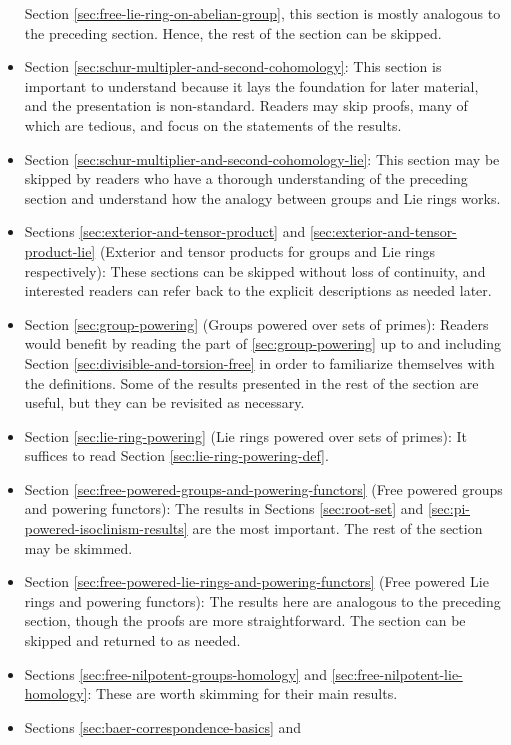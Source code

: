 \documentclass{ucetd}
\begin{document}
\begin{itemize}
  Section \ref{sec:free-lie-ring-on-abelian-group}, this section is
  mostly analogous to the preceding section. Hence, the rest of the
  section can be skipped.
\item Section \ref{sec:schur-multipler-and-second-cohomology}: This
  section is important to understand because it lays the foundation
  for later material, and the presentation is non-standard. Readers
  may skip proofs, many of which are tedious, and focus on the
  statements of the results.
\item Section \ref{sec:schur-multiplier-and-second-cohomology-lie}:
  This section may be skipped by readers who have a thorough
  understanding of the preceding section and understand how the
  analogy between groups and Lie rings works.
\item Sections \ref{sec:exterior-and-tensor-product} and
  \ref{sec:exterior-and-tensor-product-lie} (Exterior and tensor
  products for groups and Lie rings respectively): These sections can
  be skipped without loss of continuity, and interested readers can
  refer back to the explicit descriptions as needed later.
\item Section \ref{sec:group-powering} (Groups powered over sets of
  primes): Readers would benefit by reading the part of
  \ref{sec:group-powering} up to and including Section
  \ref{sec:divisible-and-torsion-free} in order to familiarize
  themselves with the definitions. Some of the results presented in
  the rest of the section are useful, but they can be revisited as
  necessary.
\item Section \ref{sec:lie-ring-powering} (Lie rings powered over sets
  of primes): It suffices to read Section
  \ref{sec:lie-ring-powering-def}.
\item Section \ref{sec:free-powered-groups-and-powering-functors}
  (Free powered groups and powering functors): The results in Sections
  \ref{sec:root-set} and \ref{sec:pi-powered-isoclinism-results} are
  the most important. The rest of the section may be skimmed.
\item Section \ref{sec:free-powered-lie-rings-and-powering-functors}
  (Free powered Lie rings and powering functors): The results here are
  analogous to the preceding section, though the proofs are more
  straightforward. The section can be skipped and returned to as
  needed.
\item Sections \ref{sec:free-nilpotent-groups-homology} and
  \ref{sec:free-nilpotent-lie-homology}: These are worth skimming for
  their main results.
\item Sections \ref{sec:baer-correspondence-basics} and

\end{itemize}
\end{document}
